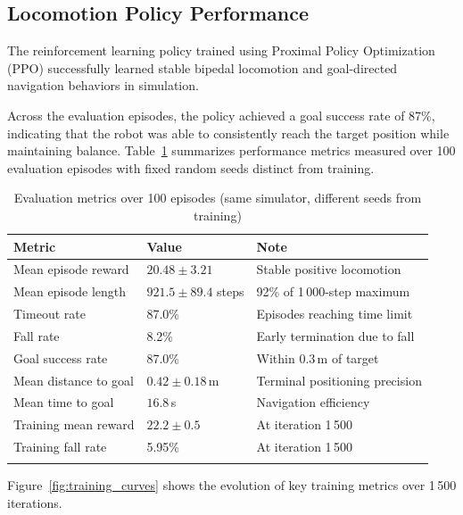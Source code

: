 \documentclass[pdflatex,sn-mathphys-num]{sn-jnl}%
\theoremstyle{thmstyleone}%
\theoremstyle{thmstyletwo}%
\theoremstyle{thmstylethree}%
\begin{document}
\subsection{Locomotion Policy Performance}
The reinforcement learning policy trained using Proximal Policy Optimization (PPO) successfully learned stable bipedal locomotion and goal-directed navigation behaviors in simulation.

Across the evaluation episodes, the policy achieved a goal success rate of 87\%, indicating that the robot was able to consistently reach the target position while maintaining balance.
Table~\ref{tab:eval} summarizes performance metrics measured over 100 evaluation
episodes with fixed random seeds distinct from training.

\begin{table}[ht]
\caption{Evaluation metrics over 100 episodes (same simulator, different seeds
from training)}\label{tab:eval}%
\begin{tabular}{@{}lll@{}}
\toprule
Metric & Value & Note \\
\midrule
Mean episode reward    & $20.48 \pm 3.21$      & Stable positive locomotion \\
Mean episode length    & $921.5 \pm 89.4$ steps & 92\% of 1\,000-step maximum \\
Timeout rate           & 87.0\%                 & Episodes reaching time limit \\
Fall rate              & 8.2\%                  & Early termination due to fall \\
Goal success rate      & 87.0\%                 & Within 0.3\,m of target \\
Mean distance to goal  & $0.42 \pm 0.18$\,m     & Terminal positioning precision \\
Mean time to goal      & $16.8$\,s              & Navigation efficiency \\
Training mean reward   & $22.2 \pm 0.5$         & At iteration 1\,500 \\
Training fall rate     & 5.95\%                 & At iteration 1\,500 \\
\botrule
\end{tabular}
\end{table}

Figure~\ref{fig:training_curves} shows the evolution of key training metrics over 1\,500 iterations.
\end{document}
